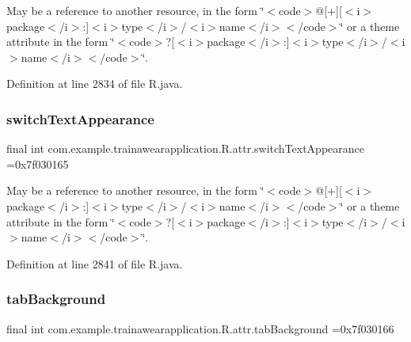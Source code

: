 May be a reference to another resource, in the form \char`\"{}$<$code$>$@\mbox{[}+\mbox{]}\mbox{[}$<$i$>$package$<$/i$>$\+:\mbox{]}$<$i$>$type$<$/i$>$/$<$i$>$name$<$/i$>$$<$/code$>$\char`\"{} or a theme attribute in the form \char`\"{}$<$code$>$?\mbox{[}$<$i$>$package$<$/i$>$\+:\mbox{]}$<$i$>$type$<$/i$>$/$<$i$>$name$<$/i$>$$<$/code$>$\char`\"{}. 

Definition at line 2834 of file R.\+java.

\mbox{\label{classcom_1_1example_1_1trainawearapplication_1_1_r_1_1attr_afff80002ac9684ea105ae366eddf0dd7}} 
\subsubsection{\texorpdfstring{switchTextAppearance}{switchTextAppearance}}
{\footnotesize\ttfamily final int com.\+example.\+trainawearapplication.\+R.\+attr.\+switch\+Text\+Appearance =0x7f030165\hspace{0.3cm}{\ttfamily [static]}}

May be a reference to another resource, in the form \char`\"{}$<$code$>$@\mbox{[}+\mbox{]}\mbox{[}$<$i$>$package$<$/i$>$\+:\mbox{]}$<$i$>$type$<$/i$>$/$<$i$>$name$<$/i$>$$<$/code$>$\char`\"{} or a theme attribute in the form \char`\"{}$<$code$>$?\mbox{[}$<$i$>$package$<$/i$>$\+:\mbox{]}$<$i$>$type$<$/i$>$/$<$i$>$name$<$/i$>$$<$/code$>$\char`\"{}. 

Definition at line 2841 of file R.\+java.

\mbox{\label{classcom_1_1example_1_1trainawearapplication_1_1_r_1_1attr_a9ceb5a38bfae7a63171b32f79e0be7a3}} 
\subsubsection{\texorpdfstring{tabBackground}{tabBackground}}
{\footnotesize\ttfamily final int com.\+example.\+trainawearapplication.\+R.\+attr.\+tab\+Background =0x7f030166\hspace{0.3cm}{\ttfamily [static]}}


